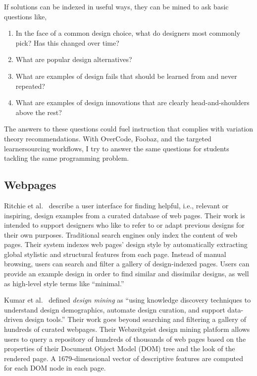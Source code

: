 If solutions can be indexed in useful ways, they can be mined to ask basic questions like,
\begin{enumerate}
\item    In the face of a common design choice, what do designers most commonly pick? Has this changed over time?
\item    What are popular design alternatives?
\item    What are examples of design fails that should be learned from and never repeated?
\item    What are examples of design innovations that are clearly head-and-shoulders above the rest?
\end{enumerate}
The answers to these questions could fuel instruction that complies with variation theory recommendations. With OverCode, Foobaz, and the targeted learnersourcing workflows, I try to answer the same questions for students tackling the same programming problem.

\subsection{Webpages}
Ritchie et al.~\cite{ritchie2011d} describe a user interface for finding helpful, i.e., relevant or inspiring, design examples from a curated database of web pages. Their work is intended to support designers who like to refer to or adapt previous designs for their own purposes. Traditional search engines only index the content of web pages. Their system indexes web pages’ design style by automatically extracting global stylistic and structural features from each page. Instead of manual browsing, users can search and filter a gallery of design-indexed pages. Users can provide an example design in order to find similar and dissimilar designs, as well as high-level style terms like ``minimal.''

Kumar et al.~\cite{webzeitgeist} defined {\it design mining} as ``using knowledge discovery techniques to understand design demographics, automate design curation, and support data-driven design tools.'' Their work goes beyond searching and filtering a gallery of hundreds of curated webpages. Their Webzeitgeist design mining platform allows users to query a repository of hundreds of thousands of web pages based on the properties of their Document Object Model (DOM) tree and the look of the rendered page. A 1679-dimensional vector of descriptive features are computed for each DOM node in each page.

